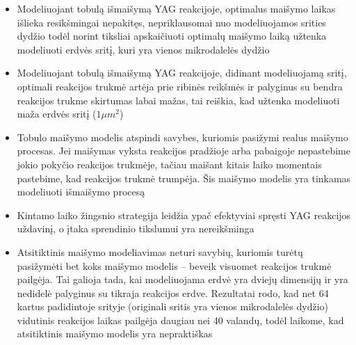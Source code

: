 \begin{itemize}
    
    \item Modeliuojant tobulą išmaišymą YAG reakcijoje, optimalus maišymo laikas išlieka resikšmingai nepakitęs, nepriklausomai nuo modeliuojamos srities dydžio todėl norint tiksliai apskaičiuoti optimalų maišymo laiką užtenka modeliuoti erdvės sritį, kuri yra vienos mikrodalelės dydžio

    \item Modeliuojant tobulą išmaišymą YAG reakcijoje, didinant modeliuojamą sritį, optimali reakcijos trukmė artėja prie ribinės reikšmės ir palyginus su bendra reakcijos trukme skirtumas labai mažas, tai reiškia, kad užtenka modeliuoti maža erdvės sritį ($1\mu m^2$)

    \item Tobulo maišymo modelis atspindi savybes, kuriomis pasižymi realus maišymo procesas. Jei maišymas vyksta reakcijos pradžioje arba pabaigoje nepastebime jokio pokyčio reakcijos trukmėje, tačiau maišant kitais laiko momentais pastebime, kad reakcijos trukmė trumpėja. Šis maišymo modelis yra tinkamas modeliuoti išmaišymo procesą

    \item Kintamo laiko žingsnio strategija leidžia ypač efektyviai spręsti YAG reakcijos uždavinį, o įtaka sprendinio tikslumui yra nereikšminga

    \item Atsitiktinis maišymo modeliavimas neturi savybių, kuriomis turėtų pasižymėti bet koks maišymo modelis -- beveik visuomet reakcijos trukmė pailgėja. Tai galioja tada, kai modeliuojama erdvė yra dviejų dimensijų ir yra nedidelė palyginus su tikraja reakcijos erdve. Rezultatai rodo, kad net 64 kartus padidintoje srityje (originali sritis yra vienos mikrodalelės dydžio) vidutinis reakcijos laikas pailgėja daugiau nei 40 valandų, todėl laikome, kad atsitiktinis maišymo modelis yra nepraktiškas

\end{itemize}